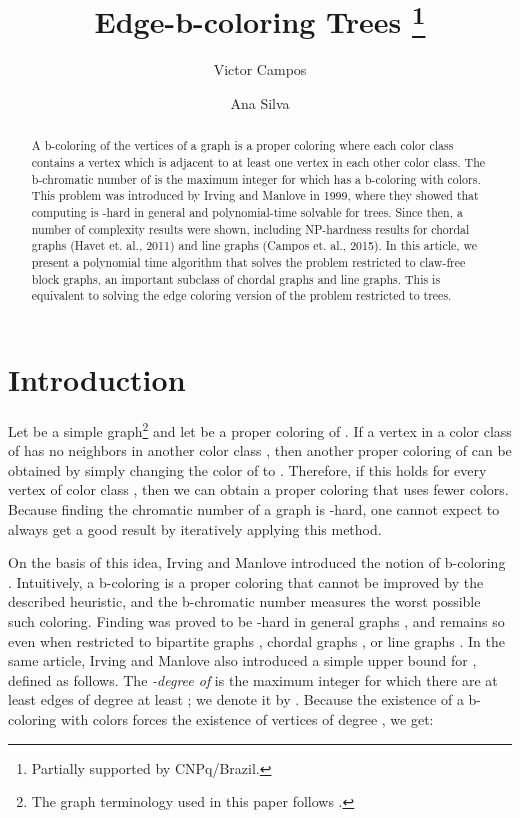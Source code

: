 \documentclass{llncs}
\title{Edge-b-coloring Trees
\thanks{Partially supported by CNPq/Brazil.}
}
\author{Victor Campos \and Ana Silva}
\institute{ParGO Group - Parallellism, Graphs and Optimization\\Universidade Federal do Cear\'a, Fortaleza, Brazil\\\email{campos@lia.ufc.br,\ anasilva@mat.ufc.br}}
\begin{document}
\maketitle

\begin{abstract}
A b-coloring of the vertices of a graph is a proper coloring where each color class contains a vertex which is adjacent to at least one vertex in each other color class. The b-chromatic number of  is the maximum integer  for which  has a b-coloring with  colors. This problem was introduced by Irving and Manlove in 1999, where they showed that computing  is -hard in general and polynomial-time solvable for trees. Since then, a number of complexity results were shown, including NP-hardness results for chordal graphs (Havet et. al., 2011) and line graphs (Campos et. al., 2015). In this article, we present a polynomial time algorithm that solves the problem restricted to claw-free block graphs, an important subclass of chordal graphs and line graphs. This is equivalent to solving the edge coloring version of the problem restricted to trees.
\end{abstract}


\section{Introduction}

Let  be a simple graph\footnote{The graph terminology used in this paper follows \cite{BM08}.} 
and let  be a proper coloring of
. If a vertex  in a color class  of  has no neighbors in another color class , then another proper coloring of  can be obtained by simply changing the color of  to . Therefore, if this holds for every vertex of color class , then we can obtain a proper coloring that uses fewer colors.  Because finding the chromatic number of a graph is -hard, one cannot expect to always get a good result by iteratively applying this method.

On the basis of this idea, Irving and Manlove introduced the notion of
b-coloring \cite{Irving.Manlove.99}.  Intuitively, a b-coloring
is a proper coloring that cannot be improved by the described heuristic,
and the b-chromatic number  measures the worst possible such coloring. Finding 
 was proved to be -hard in general graphs \cite{Irving.Manlove.99}, 
and remains so even when restricted to bipartite graphs \cite{KRATOCHVIL.etal.02}, chordal
 graphs \cite{HLS.11}, or line graphs \cite{Campos.etal.15}.  In the same article, Irving and Manlove also introduced a simple upper bound for , defined as follows. The \emph{-degree of } is the maximum integer  for which there are at least 
 edges of degree at least ; we denote it by . 
Because the existence of a b-coloring with  colors forces the existence of  vertices of degree , we get: 
\end{document}
